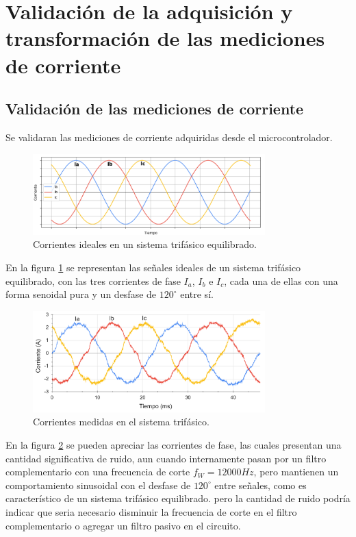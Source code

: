 \documentclass[11pt]{report}
\begin{document}
\section{Validación de la adquisición y transformación de las mediciones de corriente}

\subsection{Validación de las mediciones de corriente}
Se validaran las mediciones de corriente adquiridas desde el microcontrolador.

\begin{figure}[ht]
	\centering
	\includegraphics[width=0.8\textwidth]{imagenes/graficas/Corrientes_ABC_ideal.png}
	\caption{Corrientes ideales en un sistema trifásico equilibrado.}
	\label{corrientes_ABC_ideal}
\end{figure}
\FloatBarrier

En la figura \ref{corrientes_ABC_ideal} se representan las señales ideales de un sistema trifásico equilibrado, con las tres corrientes de fase $I_a$, $I_b$ e $I_c$, cada una de ellas con una forma senoidal pura y un desfase de $120^\circ$ entre sí.

\begin{figure}[ht]
	\centering
	\includegraphics[width=0.8\textwidth]{imagenes/graficas/Corrientes_ABC.png}
	\caption{Corrientes medidas en el sistema trifásico.}
	\label{corrientes_ABC}
\end{figure}
\FloatBarrier

En la figura \ref{corrientes_ABC} se pueden apreciar las corrientes de fase, las cuales presentan una cantidad significativa de ruido, aun cuando internamente pasan por un filtro complementario con una frecuencia de corte $f_W=12000Hz$, pero mantienen un comportamiento sinusoidal con el desfase de $120^\circ$ entre señales, como es característico de un sistema trifásico equilibrado. pero la cantidad de ruido podría indicar que seria necesario disminuir la frecuencia de corte en el filtro complementario o agregar un filtro pasivo en el circuito.
\end{document}
